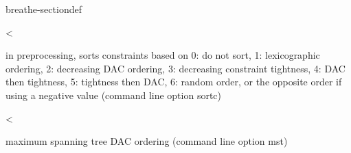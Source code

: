 \documentclass[letterpaper,10pt,openany,oneside,english]{sphinxmanual}
\begin{document}
\begin{fulllineitems}
\begin{sphinxuseclass}{breathe-sectiondef}
\begin{fulllineitems}
\end{fulllineitems}


\begin{fulllineitems}
\label{\detokenize{ref/ref_cpp:_CPPv4N8ToulBar26MSTDACE}}\label{\detokenize{ref/ref_cpp:_CPPv3N8ToulBar26MSTDACE}}\label{\detokenize{ref/ref_cpp:_CPPv2N8ToulBar26MSTDACE}}\label{\detokenize{ref/ref_cpp:ToulBar2::MSTDAC__b}}
\pysigstartsignatures
\pysigstartmultiline
{}
\pysigstopmultiline
\pysigstopsignatures
\sphinxAtStartPar
\textless{} 

\sphinxAtStartPar
in preprocessing, sorts constraints based on 0: do not sort, 1: lexicographic ordering, 2: decreasing DAC ordering, 3: decreasing constraint tightness, 4: DAC then tightness, 5: tightness then DAC, 6: random order, or the opposite order if using a negative value (command line option \sphinxhyphen{}sortc) 

\end{fulllineitems}


\begin{fulllineitems}
\label{\detokenize{ref/ref_cpp:_CPPv4N8ToulBar23DEEE}}\label{\detokenize{ref/ref_cpp:_CPPv3N8ToulBar23DEEE}}\label{\detokenize{ref/ref_cpp:_CPPv2N8ToulBar23DEEE}}\label{\detokenize{ref/ref_cpp:ToulBar2::DEE__i}}
\pysigstartsignatures
\pysigstartmultiline
{}
\pysigstopmultiline
\pysigstopsignatures
\sphinxAtStartPar
\textless{} 

\sphinxAtStartPar
maximum spanning tree DAC ordering (command line option \sphinxhyphen{}mst) 

\end{fulllineitems}



\end{sphinxuseclass}
\end{fulllineitems}
\end{document}
